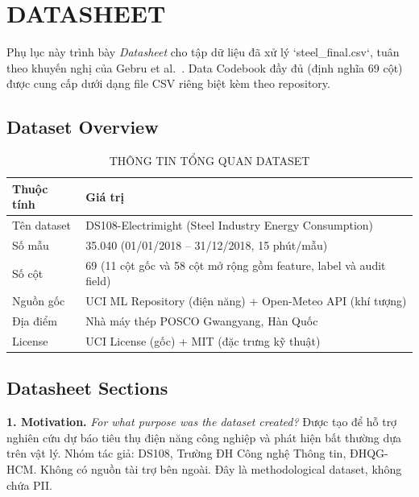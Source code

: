 \newpage
\appendices

\section{DATASHEET}
\label{app:datasheet}

Phụ lục này trình bày \textit{Datasheet} cho tập dữ liệu đã xử lý `steel\_final.csv`, tuân theo khuyến nghị của Gebru et al.~\cite{gebru2021datasheets}.
Data Codebook đầy đủ (định nghĩa 69 cột) được cung cấp dưới dạng file CSV riêng biệt kèm theo repository.

\subsection{Dataset Overview}
\label{app:dataset-overview}

\begin{table}[htbp]
\caption{THÔNG TIN TỔNG QUAN DATASET}
\centering
\small
\begin{tabular}{@{}p{2.5cm}p{5.0cm}@{}}
\toprule
Thuộc tính & Giá trị \\
\midrule
Tên dataset & DS108-Electrimight (Steel Industry Energy Consumption) \\
Số mẫu & 35.040 (01/01/2018 -- 31/12/2018, 15 phút/mẫu) \\
Số cột & 69 (11 cột gốc và 58 cột mở rộng gồm feature, label và audit field) \\
Nguồn gốc & UCI ML Repository (điện năng) + Open-Meteo API (khí tượng) \\
Địa điểm & Nhà máy thép POSCO Gwangyang, Hàn Quốc \\
License & UCI License (gốc) + MIT (đặc trưng kỹ thuật) \\
\bottomrule
\end{tabular}
\end{table}

\subsection{Datasheet Sections}
\label{app:datasheet-gebru}

\noindent\textbf{1. Motivation.}
\textit{For what purpose was the dataset created?}
Được tạo để hỗ trợ nghiên cứu dự báo tiêu thụ điện năng công nghiệp và phát hiện bất thường dựa trên vật lý.
Nhóm tác giả: DS108, Trường ĐH Công nghệ Thông tin, ĐHQG-HCM.
Không có nguồn tài trợ bên ngoài.
Đây là methodological dataset, không chứa PII.

